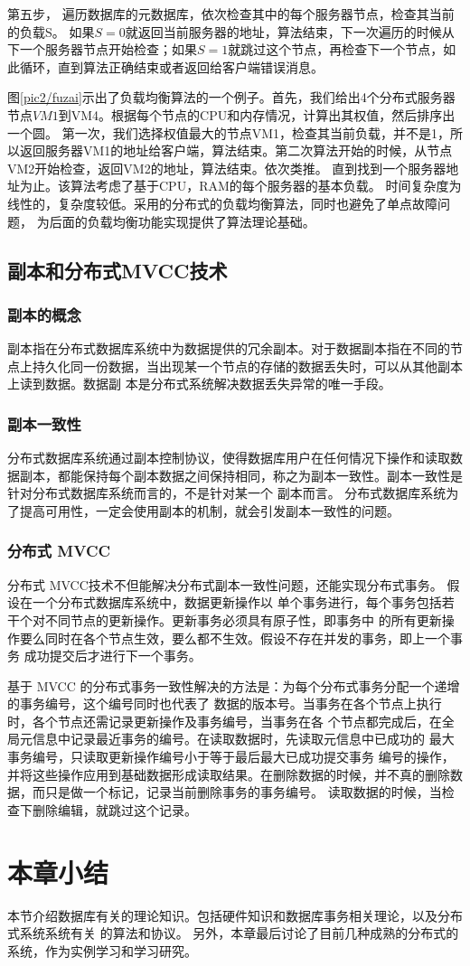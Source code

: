 第五步，
遍历数据库的元数据库，依次检查其中的每个服务器节点，检查其当前的负载S。
如果$ S=0 $就返回当前服务器的地址，算法结束，下一次遍历的时候从下一个服务器节点开始检查；如果$ S=1 $就跳过这个节点，再检查下一个节点，如此循环，直到算法正确结束或者返回给客户端错误消息。

图\ref{pic2/fuzai}示出了负载均衡算法的一个例子。首先，我们给出4个分布式服务器节点$ VM1 $到VM4。根据每个节点的CPU和内存情况，计算出其权值，然后排序出一个圆。
第一次，我们选择权值最大的节点VM1，检查其当前负载，并不是1，所以返回服务器VM1的地址给客户端，算法结束。第二次算法开始的时候，从节点VM2开始检查，返回VM2的地址，算法结束。依次类推。
直到找到一个服务器地址为止。该算法考虑了基于CPU，RAM的每个服务器的基本负载。
时间复杂度为线性的，复杂度较低。采用的分布式的负载均衡算法，同时也避免了单点故障问题，
为后面的负载均衡功能实现提供了算法理论基础。
\subsection{副本和分布式MVCC技术}
\subsubsection{副本的概念}
副本指在分布式数据库系统中为数据提供的冗余副本。对于数据副本指在不同的节
点上持久化同一份数据，当出现某一个节点的存储的数据丢失时，可以从其他副本上读到数据。数据副
本是分布式系统解决数据丢失异常的唯一手段。
\subsubsection{副本一致性}
分布式数据库系统通过副本控制协议，使得数据库用户在任何情况下操作和读取数据副本，都能保持每个副本数据之间保持相同，称之为副本一致性。副本一致性是针对分布式数据库系统而言的，不是针对某一个
副本而言。
分布式数据库系统为了提高可用性，一定会使用副本的机制，就会引发副本一致性的问题。
\subsubsection{分布式 MVCC}
分布式 MVCC技术不但能解决分布式副本一致性问题，还能实现分布式事务。
假设在一个分布式数据库系统中，数据更新操作以
单个事务进行，每个事务包括若干个对不同节点的更新操作。更新事务必须具有原子性，即事务中
的所有更新操作要么同时在各个节点生效，要么都不生效。假设不存在并发的事务，即上一个事务
成功提交后才进行下一个事务。

基于 MVCC 的分布式事务一致性解决的方法是：为每个分布式事务分配一个递增的事务编号，这个编号同时也代表了
数据的版本号。当事务在各个节点上执行时，各个节点还需记录更新操作及事务编号，当事务在各
个节点都完成后，在全局元信息中记录最近事务的编号。在读取数据时，先读取元信息中已成功的
最大事务编号，只读取更新操作编号小于等于最后最大已成功提交事务
编号的操作，并将这些操作应用到基础数据形成读取结果。在删除数据的时候，并不真的删除数据，而只是做一个标记，记录当前删除事务的事务编号。
读取数据的时候，当检查下删除编辑，就跳过这个记录。
\section{本章小结}
本节介绍数据库有关的理论知识。包括硬件知识和数据库事务相关理论，以及分布式系统系统有关
的算法和协议。
另外，本章最后讨论了目前几种成熟的分布式的系统，作为实例学习和学习研究。